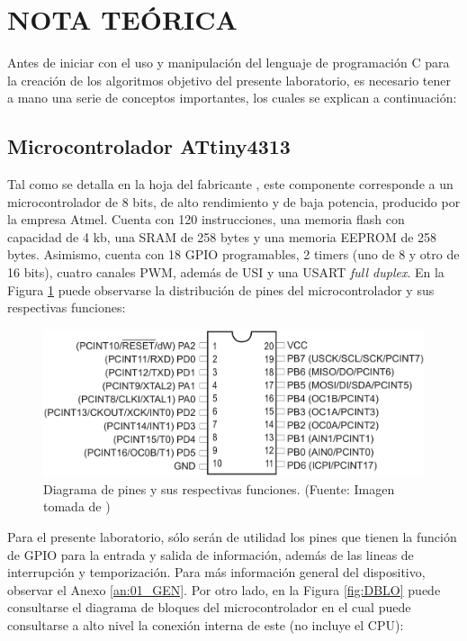 \newpage
\section{NOTA TEÓRICA}

Antes de iniciar con el uso y manipulación del lenguaje de programación C para la creación de los algoritmos objetivo del presente laboratorio, es necesario tener a mano una serie de conceptos importantes, los cuales se explican a continuación: 

\subsection{Microcontrolador ATtiny4313}
Tal como se detalla en la hoja del fabricante \cite{AT}, este componente corresponde a un microcontrolador de 8 bits, de alto rendimiento y de baja potencia, producido por la empresa Atmel. Cuenta con 120 instrucciones, una memoria flash con capacidad de 4 kb, una SRAM de 258 bytes y una memoria EEPROM de 258 bytes. Asimismo, cuenta con 18 GPIO programables, 2 timers (uno de 8 y otro de 16 bits), cuatro canales PWM, además de USI y una USART \textit{full duplex}. En la Figura \ref{fig:AT_pins} puede observarse la distribución de pines del microcontrolador y sus respectivas funciones:  

\begin{figure}[H]
\centering
\includegraphics[width=140mm]{./Figuras/Nota_teorica/AT_pins}
\caption{Diagrama de pines y sus respectivas funciones. (Fuente: Imagen tomada de \cite{AT})}
\label{fig:AT_pins}
\end{figure}

Para el presente laboratorio, sólo serán de utilidad los pines que tienen la función de GPIO para la entrada y salida de información, además de las lineas de interrupción y temporización. Para más información general del dispositivo, observar el Anexo \ref{an:01_GEN}. Por otro lado, en la Figura \ref{fig:DBLO} puede consultarse el diagrama de bloques del microcontrolador en el cual puede consultarse a alto nivel la conexión interna de este (no incluye el CPU):

